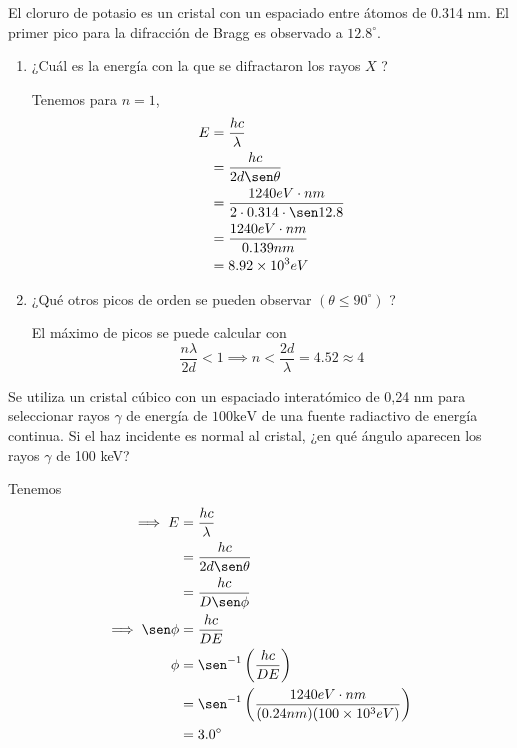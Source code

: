 





\begin{problema}
    El cloruro de potasio es un cristal con un espaciado entre átomos de 0.314 nm. El primer pico para la difracción de Bragg es observado a $12.8^{\circ}$. 
    \begin{enumerate}
        \item ¿Cuál es la energía con la que se difractaron los rayos $X$ ?
        \begin{sol}
            Tenemos para $n=1$, 
            \begin{align*}
                E &= \frac{hc}{\lambda}\\
                  &= \frac{hc}{2d\sen \theta}\\
                  &= \frac{1240 eV\cdot nm}{2\cdot 0.314\cdot \sen 12.8}\\
                  &= \frac{1240 eV\cdot nm}{0.139 nm}\\
                  &= 8.92 \times 10^3 eV
            \end{align*}
        \end{sol}
        \item  ¿Qué otros picos de orden se pueden observar $\left(\theta \leq 90^{\circ}\right)$ ?
        \begin{sol}
            El máximo de picos se puede calcular con 
            $$\frac{n\lambda}{2d}<1\implies n<\frac{2d}{\lambda}=4.52\approx 4$$
        \end{sol}
    \end{enumerate}
\end{problema}

\begin{problema}
    Se utiliza un cristal cúbico con un espaciado interatómico de 0,24 nm para seleccionar rayos $\gamma$ de energía de $100 \mathrm{keV}$ de una fuente radiactivo de energía continua. Si el haz incidente es normal al cristal, ¿en qué ángulo aparecen los rayos $\gamma$ de 100 keV?
    \begin{sol}
        Tenemos 
        \begin{align*}
            \implies E &= \frac{hc}{\lambda}\\
              &= \frac{hc}{2d\sen \theta}\\
              &= \frac{hc}{D\sen \phi}\\
            \implies \sen \phi &= \frac{hc}{DE}\\
            \phi &= \sen^{-1}\left(\frac{hc}{DE}\right)\\
            &= \sen^{-1}\left(\frac{1240 eV\cdot nm}{(0.24 nm)(100\times 10^3 eV)}\right)\\
            &= 3.0^{\circ}
        \end{align*}
    \end{sol}
\end{problema}

